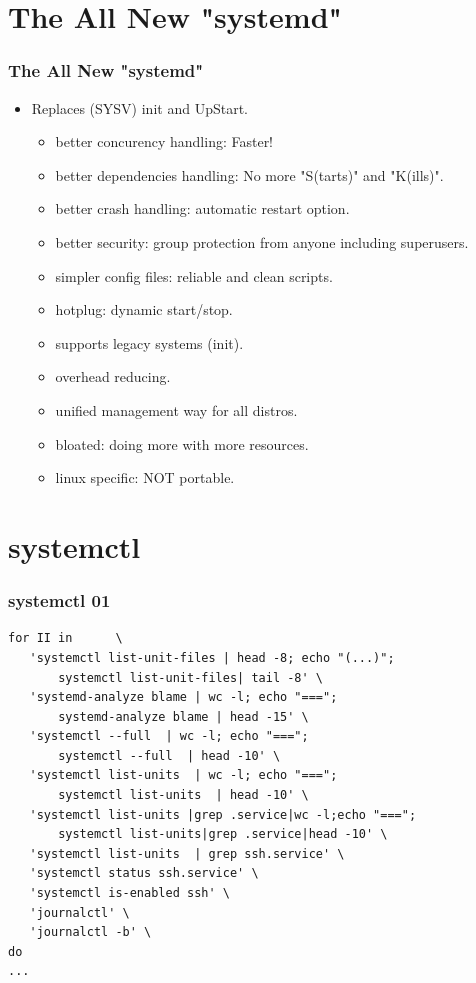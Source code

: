\documentclass[aspectratio=169, xcolor=table, notheorems, hyperref={pdfpagelabels=false}]{beamer}
\begin{document}
\section{The All New "systemd"}
\begin{frame}
\frametitle{The All New "systemd"}
\begin{itemize}
\item Replaces (SYSV) init and UpStart.
\begin{itemize}
\item better concurency handling: Faster!
\item better dependencies handling: No more "S(tarts)" and "K(ills)".
\item better crash handling: automatic restart option.
\item better security: group protection from anyone including superusers.
\item simpler config files: reliable and clean scripts.
\item hotplug: dynamic start/stop.
\item supports legacy systems (init).
\item overhead reducing.
\item unified management way for all distros.
\item bloated: doing more with more resources.
\item linux specific: NOT portable.
\end{itemize}
\end{itemize}
\end{frame}

\section{systemctl}
\begin{frame}[fragile]
\frametitle{systemctl 01}
\begin{lstlisting}[basicstyle=\ttfamily\small]
for II in      \
   'systemctl list-unit-files | head -8; echo "(...)";
       systemctl list-unit-files| tail -8' \
   'systemd-analyze blame | wc -l; echo "===";
       systemd-analyze blame | head -15' \
   'systemctl --full  | wc -l; echo "===";
       systemctl --full  | head -10' \
   'systemctl list-units  | wc -l; echo "===";
       systemctl list-units  | head -10' \
   'systemctl list-units |grep .service|wc -l;echo "===";
       systemctl list-units|grep .service|head -10' \
   'systemctl list-units  | grep ssh.service' \
   'systemctl status ssh.service' \
   'systemctl is-enabled ssh' \
   'journalctl' \
   'journalctl -b' \
do
...
\end{lstlisting}

\end{frame}
\end{document}
